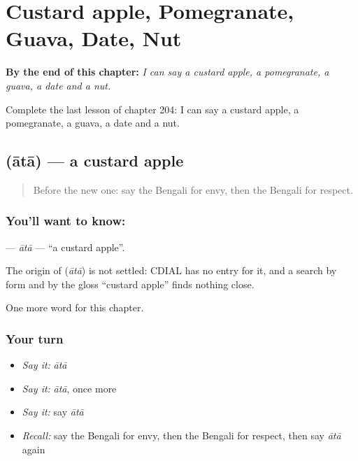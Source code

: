 
\chapter{Custard apple, Pomegranate, Guava, Date, Nut}
\label{ch:bn-custard-apple-pomegranate-guava-date-nut}

\begin{chapteropening}
\textbf{By the end of this chapter:} \emph{I can say a custard apple, a pomegranate, a guava, a date and a nut.}

Complete the last lesson of chapter 204: I can say a custard apple, a pomegranate, a guava, a date and a nut.
\end{chapteropening}

\section[\texorpdfstring{\bn{আতা} (ātā)}{আতা (ātā)}]{ (ātā) — a custard apple}

\label{lesson:BN-C204-ata}



\begin{quote}
Before the new one: say the Bengali for envy, then the Bengali for respect.
\end{quote}

\subsection*{You'll want to know: }
\textbf{} — \emph{ātā} — \textquotedblleft{}a custard apple\textquotedblright{}.

\begin{cousinweb}
The origin of \textbf{} (\emph{ātā}) is not settled: CDIAL has no entry for it, and a search by form and by the gloss \textquotedblleft{}custard apple\textquotedblright{} finds nothing close.
\end{cousinweb}

\begin{grammarlens}[title={What you've built}]
One more word for this chapter.
\end{grammarlens}

\subsection*{Your turn}
\begin{itemize}
\raggedright
  \item \emph{Say it:} \emph{ātā}
  \item \emph{Say it:} \emph{ātā}, once more
  \item \emph{Say it:} say \emph{ātā}
  \item \emph{Recall:} say the Bengali for envy, then the Bengali for respect, then say \emph{ātā} again
\end{itemize}

